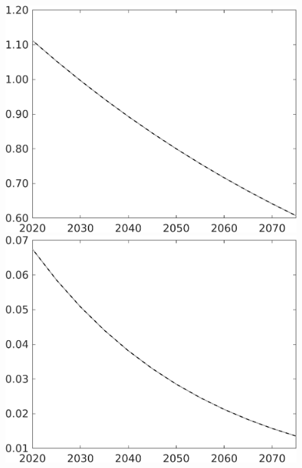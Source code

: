 \documentclass[12pt]{article}
\begin{document}
\begin{figure}[h!!]
\begin{minipage}[]{0.32\textwidth}
	\end{minipage}	
	\begin{minipage}[]{0.32\textwidth}
		\includegraphics[width=1\textwidth]{../../codding_model/own_basedOnFried/optimalPol_010922_revision/figures/all_13Sept22/CompTaul_LFBAU_Reg0_pg_spillover0_nsk1_xgr1_knspil1_sep1_countec0_GovRev0_etaa0.79_lgd0.png}
	\end{minipage}		
	\begin{minipage}[]{0.32\textwidth}
		\includegraphics[width=1\textwidth]{../../codding_model/own_basedOnFried/optimalPol_010922_revision/figures/all_13Sept22/CompTaul_LFBAU_Reg0_pepn_spillover0_nsk1_xgr1_knspil1_sep1_countec0_GovRev0_etaa0.79_lgd0.png}

\end{minipage}
\end{figure}
\end{document}
